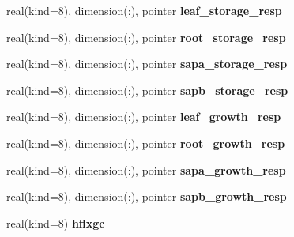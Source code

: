 \begin{DoxyCompactItemize}
\item 
\hypertarget{structrk4__coms_1_1rk4patchtype_a35d808287ef80f8d4128f77bcbc66cd7}{
real(kind=8), dimension(:), pointer {\bfseries leaf\_\-storage\_\-resp}}
\label{structrk4__coms_1_1rk4patchtype_a35d808287ef80f8d4128f77bcbc66cd7}

\item 
\hypertarget{structrk4__coms_1_1rk4patchtype_a73b817e6ad63ea7b1cf868f98286ee7b}{
real(kind=8), dimension(:), pointer {\bfseries root\_\-storage\_\-resp}}
\label{structrk4__coms_1_1rk4patchtype_a73b817e6ad63ea7b1cf868f98286ee7b}

\item 
\hypertarget{structrk4__coms_1_1rk4patchtype_a636cf0c32ce7490eb5794d1c8e20af29}{
real(kind=8), dimension(:), pointer {\bfseries sapa\_\-storage\_\-resp}}
\label{structrk4__coms_1_1rk4patchtype_a636cf0c32ce7490eb5794d1c8e20af29}

\item 
\hypertarget{structrk4__coms_1_1rk4patchtype_a297e8260c1eeb1c062ee2cdf1f657641}{
real(kind=8), dimension(:), pointer {\bfseries sapb\_\-storage\_\-resp}}
\label{structrk4__coms_1_1rk4patchtype_a297e8260c1eeb1c062ee2cdf1f657641}

\item 
\hypertarget{structrk4__coms_1_1rk4patchtype_a82c9de3f3afda4b2d6cb13a1c1987bde}{
real(kind=8), dimension(:), pointer {\bfseries leaf\_\-growth\_\-resp}}
\label{structrk4__coms_1_1rk4patchtype_a82c9de3f3afda4b2d6cb13a1c1987bde}

\item 
\hypertarget{structrk4__coms_1_1rk4patchtype_a9b2ad31411083d775c453f637c64fa6c}{
real(kind=8), dimension(:), pointer {\bfseries root\_\-growth\_\-resp}}
\label{structrk4__coms_1_1rk4patchtype_a9b2ad31411083d775c453f637c64fa6c}

\item 
\hypertarget{structrk4__coms_1_1rk4patchtype_ac0055c6db248137eecc287d6e872bd82}{
real(kind=8), dimension(:), pointer {\bfseries sapa\_\-growth\_\-resp}}
\label{structrk4__coms_1_1rk4patchtype_ac0055c6db248137eecc287d6e872bd82}

\item 
\hypertarget{structrk4__coms_1_1rk4patchtype_ad222566eccb9cc6436105828efdb3da2}{
real(kind=8), dimension(:), pointer {\bfseries sapb\_\-growth\_\-resp}}
\label{structrk4__coms_1_1rk4patchtype_ad222566eccb9cc6436105828efdb3da2}

\item 
\hypertarget{structrk4__coms_1_1rk4patchtype_ac7baf351e7d3ce11b8aab8a2e98afad8}{
real(kind=8) {\bfseries hflxgc}}
\label{structrk4__coms_1_1rk4patchtype_ac7baf351e7d3ce11b8aab8a2e98afad8}


\end{DoxyCompactItemize}
